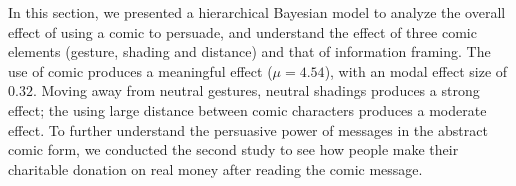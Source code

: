 
In this section, we presented a hierarchical Bayesian model to analyze the overall effect of using a comic to persuade, and understand the effect of three comic elements (gesture, shading and distance) and that of information framing. The use of comic produces a meaningful effect ($\mu=4.54$), with an modal effect size of $0.32$. Moving away from neutral gestures, neutral shadings produces a strong effect; the using large distance between comic characters produces a moderate effect. To further understand the persuasive power of messages in the abstract comic form, we conducted the second study to see how people make their charitable donation on real money after reading the comic message.
